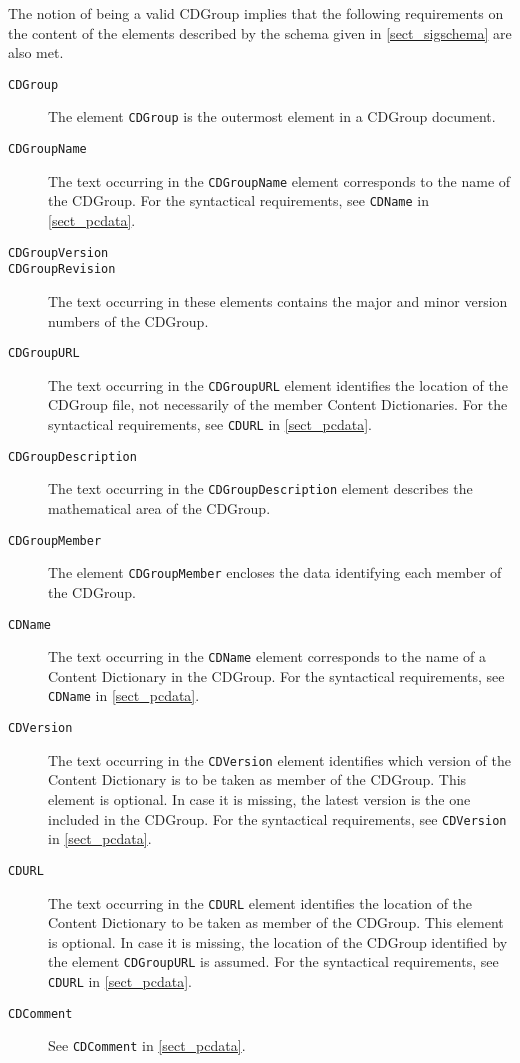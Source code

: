 The notion of being a valid CDGroup implies that the following requirements on the content
of the elements described by the schema given in \ref{sect_sigschema} are also met.

\begin{description}
\item[\lstinline|CDGroup|] The \XML element \lstinline|CDGroup| is the outermost element
  in a CDGroup document.
\item[\lstinline|CDGroupName|] The text occurring in the \lstinline|CDGroupName| element
  corresponds to the name of the CDGroup. For the syntactical requirements, see
  \lstinline|CDName| in \ref{sect_pcdata}.
\item[\lstinline|CDGroupVersion|]
\item[\lstinline|CDGroupRevision|] The text occurring in these elements contains the
  major and minor version numbers of the CDGroup.
\item[\lstinline|CDGroupURL|] The text occurring in the \lstinline|CDGroupURL| element
  identifies the location of the CDGroup file, not necessarily of the member Content
  Dictionaries. For the syntactical requirements, see \lstinline|CDURL| in
  \ref{sect_pcdata}.
\item[\lstinline|CDGroupDescription|] The text occurring in the
  \lstinline|CDGroupDescription| element describes the mathematical area of the CDGroup.
\item[\lstinline|CDGroupMember|] The \XML element \lstinline|CDGroupMember| encloses the
  data identifying each member of the CDGroup.
\item[\lstinline|CDName|] The text occurring in the \lstinline|CDName| element
  corresponds to the name of a Content Dictionary in the CDGroup. For the syntactical
  requirements, see \lstinline|CDName| in \ref{sect_pcdata}.
\item[\lstinline|CDVersion|] The text occurring in the \lstinline|CDVersion| element
  identifies which version of the Content Dictionary is to be taken as member of the
  CDGroup. This element is optional. In case it is missing, the latest version is the one
  included in the CDGroup.  For the syntactical requirements, see \lstinline|CDVersion|
  in \ref{sect_pcdata}.
\item[\lstinline|CDURL|] The text occurring in the \lstinline|CDURL| element identifies
  the location of the Content Dictionary to be taken as member of the CDGroup. This
  element is optional. In case it is missing, the location of the CDGroup identified by
  the element \lstinline|CDGroupURL| is assumed.  For the syntactical requirements, see
  \lstinline|CDURL| in \ref{sect_pcdata}.
\item[\lstinline|CDComment|] See \lstinline|CDComment| in \ref{sect_pcdata}.
\end{description}

